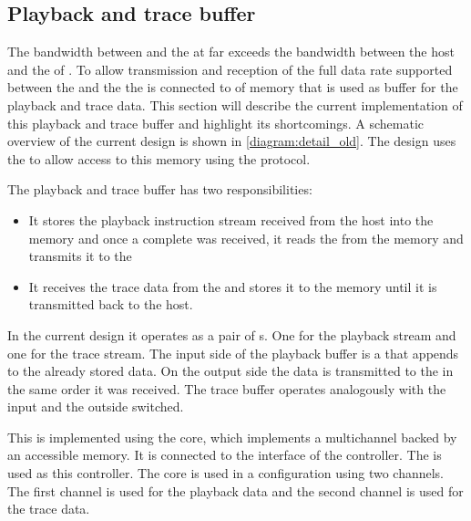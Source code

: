 \subsection{Playback and trace buffer}\label{sec:old-pb-trace-management}
The bandwidth between \FPGA{} and the \ASIC{} at \ASICBandwidth{} far exceeds the bandwidth between the host and the \FPGA{} of \HostBandwidth{}. To allow transmission and reception of the full data rate supported between the \FPGA{} and the \ASIC{} the \FPGA{} is connected to \DDRSIZE{} of \DDR{} memory that is used as buffer for the playback and trace data. This section will describe the current implementation of this playback and trace buffer and highlight its shortcomings. A schematic overview of the current design is shown in \autoref{diagram:detail_old}. The \FPGA{} design uses the \XilinxMIG{} to allow access to this \DDR{} memory using the \AXI{} protocol.

The playback and trace buffer has two responsibilities:
\begin{itemize}
  \item It stores the playback instruction stream received from the host into the \DDR{} memory and once a complete \PlaybackProgram{} was received, it reads the \PlaybackProgram{} from the memory and transmits it to the \pbexec{}
  \item It receives the trace data from the \pbexec{} and stores it to the \DDR{} memory until it is transmitted back to the host.
\end{itemize}

In the current \FPGA{} design it operates as a pair of \FIFO{}s. One for the playback stream and one for the trace stream. The input side of the playback buffer is a \ValidNextStream{} that appends to the already stored data. On the output side the data is transmitted to the \pbexec{} in the same order it was received. The trace buffer operates analogously with the input and the outside switched.

This \FIFO{} is implemented using the \Xilinx{} \VFIFO{} core, which implements a multichannel \FIFO{} backed by an \AXI{} accessible memory. It is connected to the \AXI{} interface of the \DDR{} controller. The \XilinxMIG{} is used as this \DDR{} controller. The \VFIFO{} core is used in a configuration using two channels. The first channel is used for the playback data and the second channel is used for the trace data.

